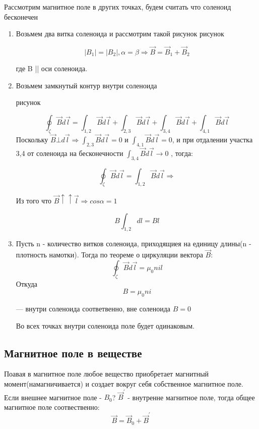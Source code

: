 \documentclass[../main.tex]{subfiles}
\begin{document}
Рассмотрим магнитное поле в других точках, будем считать что соленоид бесконечен
\begin{enumerate}
    \item Возьмем два витка соленоида и рассмотрим такой рисунок
    рисунок 

    \[|B_1| = |B_2| , \alpha = \beta \Rightarrow \vec B = \vec B_1 + \vec B_2\]
    \begin{center}
        где B || оси соленоида.
    \end{center}

    \item Возьмем замкнутый контур внутри соленоида 
    
    рисунок
    
    \[ \oint_{\zeta} \vec B d \vec l = \int_{1,2} \vec B d \vec l + \int_{2,3} \vec B d \vec l + \int_{3,4} \vec B d \vec l + \int_{4,1} \vec B d \vec l\]
    Поскольку $\vec B \bot d \vec l \Rightarrow \int_{2,3} \vec B d \vec l = 0$ и $\int_{4,1} \vec B d \vec l = 0$,
    и при отдалении участка 3,4 от соленоида на бесконечности $\int_{3,4} \vec B d \vec l \to 0$ ,
    тогда:
    
    \[\oint_{\zeta} \vec B d \vec l = \int_{1,2} \vec B d \vec l \Rightarrow\]
    \begin{center}
        Из того что $\vec B \uparrow \uparrow \vec l \Rightarrow cos{\alpha} = 1$
    \end{center}
    \[B\int_{1,2} dl = Bl\]

    \item Пусть n - количество витков соленоида, приходящиея на единицу длины(n - плотность намотки). Тогда по теореме о циркуляции вектора $\vec B$:
    \[\oint_{\zeta} \vec B d \vec l = \mu_0 n i l\]
    Откуда 
    \[B = \mu_0 n i\]
    \begin{center}
        --- внутри соленоида соответвенно, вне соленоида $B = 0$
    \end{center}
    Во всех точках внутри соленоида поле будет одинаковым.
\end{enumerate}

\subsection{Магнитное поле в веществе}
Поавая в магнитное поле любое вещество приобретает магнитный момент(намагничивается) и создает вокруг себя собственное магнитное поле. Если внешнее магнитное поле - $B_0$?
$\vec B^{\prime}$ - внутренне магнитное поле, тогда общее магнитное поле соотвественно: 
\[\vec B = \vec B_0 + \vec B^{\prime}\]
\end{document}
